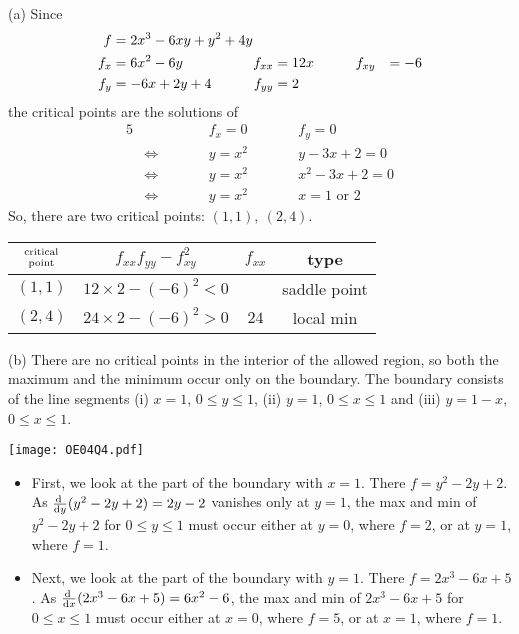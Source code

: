 \begin{solution}
 (a) Since
\begin{alignat*}{5}
f&=2x^3 - 6xy + y^2 +4y \hidewidth \\
f_x&=6x^2-6y & f_{xx}&=12x\qquad && f_{xy}&= -6\\
f_y&=-6x+2y+4\qquad & f_{yy}&=2
\end{alignat*}
the critical points are the solutions of
\begin{alignat*}{5}
& & &f_x=0\qquad & &f_y=0 \\
&\iff\qquad& &y=x^2\qquad & &y-3x+2=0 \\
&\iff& &y=x^2 & &x^2-3x+2=0 \\
&\iff& &y=x^2 & &x=1\text{ or }2 
\end{alignat*}
So, there are two critical points: $(1,1),\ (2,4)$.
\begin{center}
\renewcommand{\arraystretch}{1.3}
     \begin{tabular}{|c|c|c|c|}
     \hline
    $\Atop{\text{critical}}{\text{point}}$  & $f_{xx}f_{yy}-f_{xy}^2$ & 
                                                          $f_{xx}$ & type \\    
    \hline
     $(1,1)$  & $12\times 2-(-6)^2<0$ &    & saddle point \\ \hline
     $(2,4)$  & $24\times 2-(-6)^2>0$ & $24$ & local min \\  \hline
     \end{tabular}
\renewcommand{\arraystretch}{1.0}
\end{center}

(b)
There are no critical points in the interior of the allowed region,
so both the maximum and the minimum occur only on the boundary. The boundary
consists of the line segments (i) $x=1$, $0\le y\le 1$, (ii) $y=1$, $0\le
x\le 1$ and (iii) $y=1-x$, $0\le x\le 1$.

\begin{center}
     \texttt{[image: OE04Q4.pdf]}
\end{center}

\begin{itemize}
\item
First, we look at the part of the boundary with $x=1$. There $f=y^2-2y+2$.
As $\diff{}{y}(y^2-2y+2)=2y-2$ vanishes only at $y=1$, 
the max and min of $y^2-2y+2$ for $0\le y\le 1$ must occur either at $y=0$, 
where $f=2$, or at $y=1$, where $f=1$.

\item
Next, we look at the part of the boundary with $y=1$. There $f=2x^3-6x+5$.
As $\diff{}{x}(2x^3-6x+5)=6x^2-6$, 
the max and min of $2x^3-6x+5$ for $0\le x\le 1$ must occur either at $x=0$, 
where $f=5$, or at $x=1$, where $f=1$.


\end{itemize}
\end{solution}
